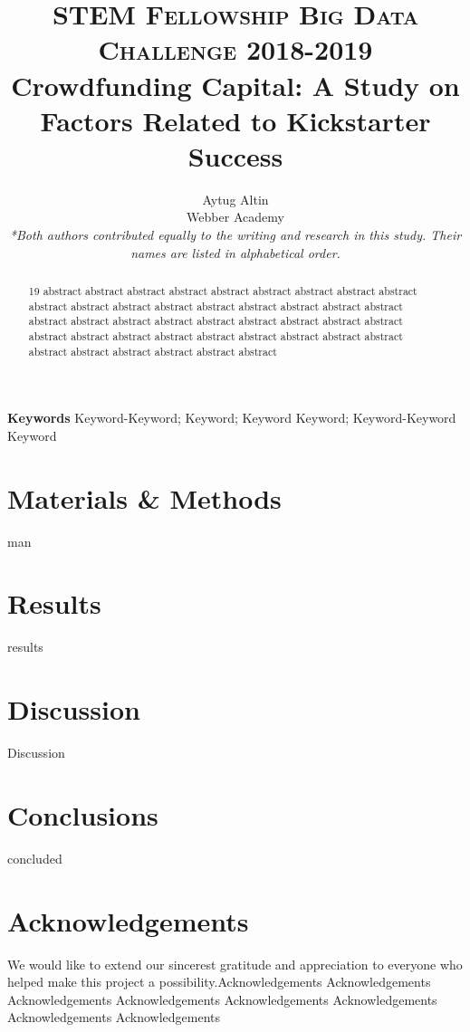 \documentclass[10pt,twocolumn,letterpaper]{article}
\title{
		\usefont{OT1}{bch}{b}{n}
		\normalfont \normalsize \textsc{STEM Fellowship Big Data Challenge 2018-2019} \\ [10pt]
		\huge Crowdfunding Capital: A Study on Factors Related to Kickstarter Success \\
}
\author[0]{Aytug Altin \\
		Webber Academy \\
        \textit{*Both authors contributed equally to the writing and research in this study. Their names are listed in alphabetical order.}}
\begin{document}
\maketitle
{}
\begin{abstract}
	  19 abstract abstract abstract abstract abstract abstract abstract abstract abstract abstract abstract abstract abstract abstract abstract abstract abstract abstract abstract abstract abstract abstract abstract abstract abstract abstract abstract abstract abstract abstract abstract abstract abstract abstract abstract abstract abstract abstract abstract abstract abstract abstract
\end{abstract}
{\textbf{Keywords}
Keyword-Keyword; Keyword; Keyword Keyword; Keyword-Keyword Keyword}





\section*{Materials \& Methods}
man
\section*{Results}
results

 

\section*{Discussion}
Discussion



\section*{Conclusions}
concluded


\section*{Acknowledgements}
We would like to extend our sincerest gratitude and appreciation to everyone who helped make this project a possibility.Acknowledgements Acknowledgements Acknowledgements Acknowledgements Acknowledgements Acknowledgements Acknowledgements Acknowledgements


{}
\end{document}
